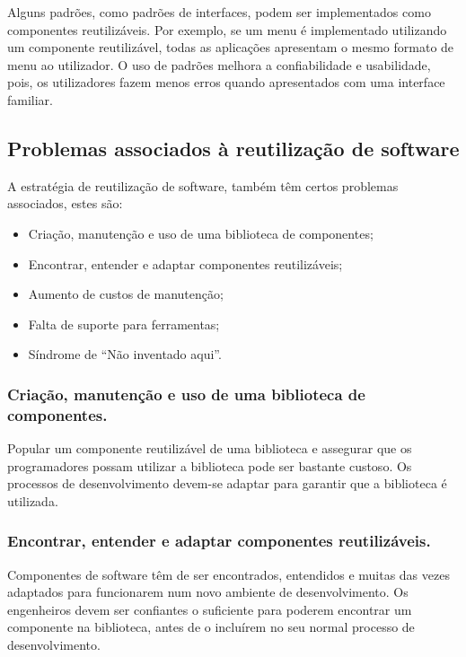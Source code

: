 \documentclass[runningheads]{llncs}
\begin{document}
Alguns padrões, como padrões de interfaces, podem ser implementados como componentes reutilizáveis. Por exemplo, se um menu é implementado utilizando um componente reutilizável, todas as aplicações apresentam o mesmo formato de menu ao utilizador. O uso de padrões melhora a confiabilidade e usabilidade, pois, os utilizadores fazem menos erros quando apresentados com uma interface familiar.

\subsection{Problemas associados à reutilização de software}

A estratégia de reutilização de software, também têm certos problemas associados, estes são:

\begin{itemize}
    \item Criação, manutenção e uso de uma biblioteca de componentes;
    \item Encontrar, entender e adaptar componentes reutilizáveis;
    \item Aumento de custos de manutenção;
    \item Falta de suporte para ferramentas;
    \item Síndrome de “Não inventado aqui”.
\end{itemize}

\subsubsection{Criação, manutenção e uso de uma biblioteca de componentes.}

Popular um componente reutilizável de uma biblioteca e assegurar que os programadores possam utilizar a biblioteca pode ser bastante custoso. Os processos de desenvolvimento devem-se adaptar para garantir que a biblioteca é utilizada.

\subsubsection{Encontrar, entender e adaptar componentes reutilizáveis.}

Componentes de software têm de ser encontrados, entendidos e muitas das vezes adaptados para funcionarem num novo ambiente de desenvolvimento. Os engenheiros devem ser confiantes o suficiente para poderem encontrar um componente na biblioteca, antes de o incluírem no seu normal processo de desenvolvimento.
\end{document}
